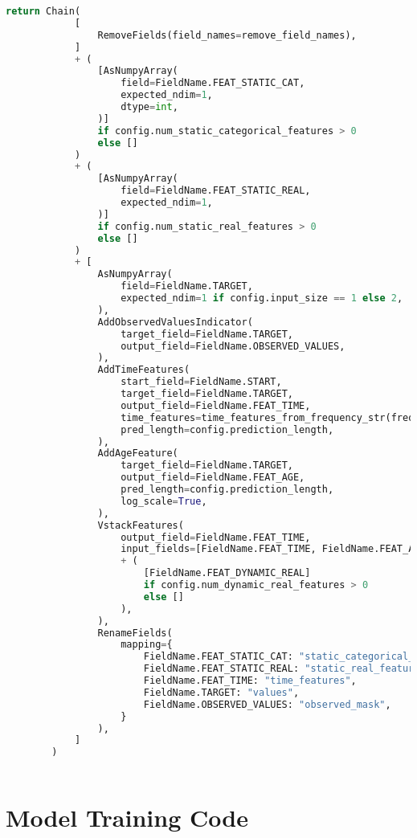 \begin{lstlisting}[language=Python, caption={Code for creating data loaders for efficient training and evaluation}, breaklines=true, label=code4]
        return Chain(
            [
                RemoveFields(field_names=remove_field_names),
            ]
            + (
                [AsNumpyArray(
                    field=FieldName.FEAT_STATIC_CAT,
                    expected_ndim=1,
                    dtype=int,
                )]
                if config.num_static_categorical_features > 0
                else []
            )
            + (
                [AsNumpyArray(
                    field=FieldName.FEAT_STATIC_REAL,
                    expected_ndim=1,
                )]
                if config.num_static_real_features > 0
                else []
            )
            + [
                AsNumpyArray(
                    field=FieldName.TARGET,
                    expected_ndim=1 if config.input_size == 1 else 2,
                ),
                AddObservedValuesIndicator(
                    target_field=FieldName.TARGET,
                    output_field=FieldName.OBSERVED_VALUES,
                ),
                AddTimeFeatures(
                    start_field=FieldName.START,
                    target_field=FieldName.TARGET,
                    output_field=FieldName.FEAT_TIME,
                    time_features=time_features_from_frequency_str(freq),
                    pred_length=config.prediction_length,
                ),
                AddAgeFeature(
                    target_field=FieldName.TARGET,
                    output_field=FieldName.FEAT_AGE,
                    pred_length=config.prediction_length,
                    log_scale=True,
                ),
                VstackFeatures(
                    output_field=FieldName.FEAT_TIME,
                    input_fields=[FieldName.FEAT_TIME, FieldName.FEAT_AGE]
                    + (
                        [FieldName.FEAT_DYNAMIC_REAL]
                        if config.num_dynamic_real_features > 0
                        else []
                    ),
                ),
                RenameFields(
                    mapping={
                        FieldName.FEAT_STATIC_CAT: "static_categorical_features",
                        FieldName.FEAT_STATIC_REAL: "static_real_features",
                        FieldName.FEAT_TIME: "time_features",
                        FieldName.TARGET: "values",
                        FieldName.OBSERVED_VALUES: "observed_mask",
                    }
                ),
            ]
        )
    

\end{lstlisting}

\section{Model Training Code}

